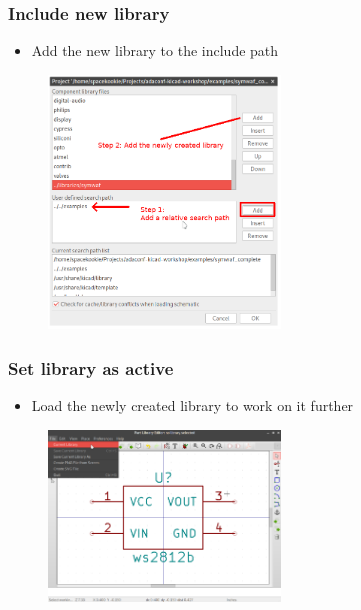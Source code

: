 \documentclass{beamer}
\begin{document}
\begin{frame}
  \frametitle{Include new library}
  \begin{itemize}
    \item Add the new library to the include path
  \end{itemize}
  \begin{figure}[H]
    \centering
    \includegraphics[width=0.55\textwidth]{images/step_05.png}
  \end{figure}
\end{frame}


\begin{frame}
  \frametitle{Set library as active}
  \begin{itemize}
    \item Load the newly created library to work on it further
  \end{itemize}
  \begin{figure}[H]
    \centering
    \includegraphics[width=0.55\textwidth]{images/step_06.png}
  \end{figure}
\end{frame}
\end{document}
